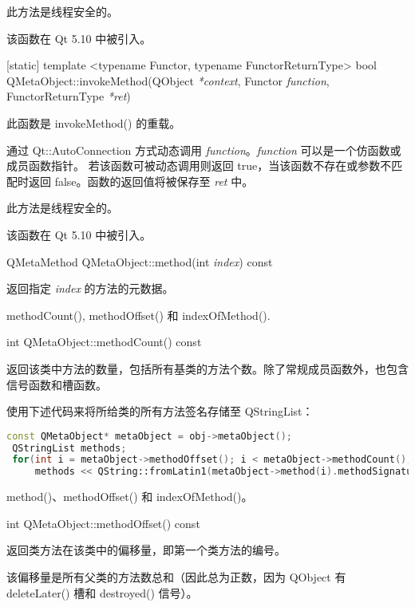 \begin{notice}
此方法是线程安全的。
\end{notice}

该函数在 Qt 5.10 中被引入。

[static] template <typename Functor, typename FunctorReturnType> bool QMetaObject::invokeMethod(QObject \emph{*context}, Functor \emph{function}, FunctorReturnType \emph{*ret})

此函数是 invokeMethod() 的重载。

通过 Qt::AutoConnection 方式动态调用 \emph{function}。\emph{function} 可以是一个仿函数或成员函数指针。
若该函数可被动态调用则返回 true，当该函数不存在或参数不匹配时返回 false。函数的返回值将被保存至 \emph{ret} 中。


\begin{notice}
此方法是线程安全的。
\end{notice}


该函数在 Qt 5.10 中被引入。

QMetaMethod QMetaObject::method(int \emph{index}) const

返回指定 \emph{index} 的方法的元数据。

\begin{notice}[另请参阅]
methodCount(), methodOffset() 和 indexOfMethod().
\end{notice}

int QMetaObject::methodCount() const

返回该类中方法的数量，包括所有基类的方法个数。除了常规成员函数外，也包含信号函数和槽函数。

使用下述代码来将所给类的所有方法签名存储至 QStringList：

\begin{lstlisting}[language=C++]
 const QMetaObject* metaObject = obj->metaObject();
 QStringList methods;
 for(int i = metaObject->methodOffset(); i < metaObject->methodCount(); ++i)
     methods << QString::fromLatin1(metaObject->method(i).methodSignature());
\end{lstlisting}

\begin{notice}[另请参阅]
method()、methodOffset() 和 indexOfMethod()。
\end{notice}

int QMetaObject::methodOffset() const

返回类方法在该类中的偏移量，即第一个类方法的编号。

该偏移量是所有父类的方法数总和（因此总为正数，因为 QObject 有 deleteLater() 槽和 destroyed() 信号）。


